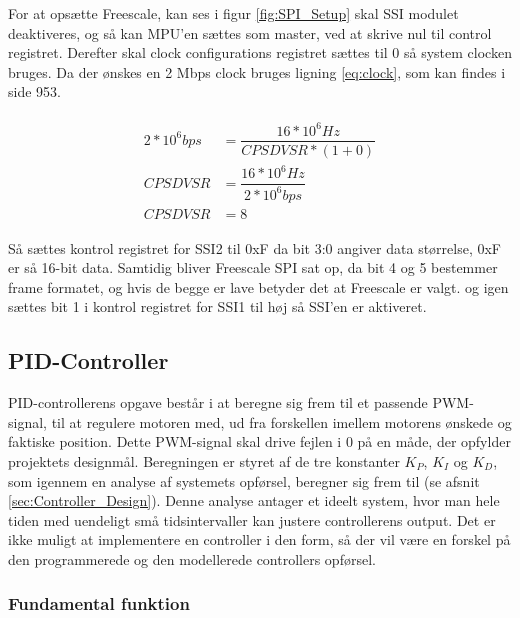 For at opsætte Freescale, kan ses i figur \ref{fig:SPI_Setup} skal SSI modulet deaktiveres, og så kan MPU'en sættes som master, ved at skrive nul til control registret.
Derefter skal clock configurations registret sættes til 0 så system clocken bruges.
Da der ønskes en 2 Mbps clock bruges ligning \eqref{eq:clock}, som kan findes i \cite{TM4C123GH6PMDatasheet} side 953.

\begin{align}
\begin{split}
2*10^6 bps &= \dfrac{16*10^6 Hz}{CPSDVSR * (1 + 0)}\\
CPSDVSR &= \dfrac{16*10^6 Hz}{2*10^6 bps}\\
CPSDVSR &= 8
\end{split}
\label{eq:clock}
\end{align}

Så sættes kontrol registret for SSI2 til 0xF da bit 3:0 angiver data størrelse, 0xF er så 16-bit data. Samtidig bliver Freescale SPI sat op, da bit 4 og 5 bestemmer frame formatet, og hvis de begge er lave betyder det at Freescale er valgt. 
og igen sættes bit 1 i kontrol registret for SSI1 til høj så SSI'en er aktiveret.

\subsection{PID-Controller}

PID-controllerens opgave består i at beregne sig frem til et passende PWM-signal, til at regulere motoren med, ud fra forskellen imellem motorens ønskede og faktiske position. Dette PWM-signal skal drive fejlen i 0 på en måde, der opfylder projektets designmål. Beregningen er styret af de tre konstanter $K_{P}$, $K_{I}$ og $K_{D}$, som igennem en analyse af systemets opførsel, beregner sig frem til (se afsnit \ref{sec:Controller_Design}). Denne analyse antager et ideelt system, hvor man hele tiden med uendeligt små tidsintervaller kan justere controllerens output. Det er ikke muligt at implementere en controller i den form, så der vil være en forskel på den programmerede og den modellerede controllers opførsel.


\subsubsection{Fundamental funktion}

